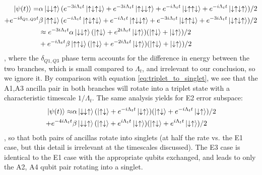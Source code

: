 \documentclass{report}
\begin{document}
\begin{align*}
    \ket{\psi(t)} = &\alpha\ket{\downarrow\downarrow\uparrow}(
        e^{-3 i \Lambda_t t }\ket{\uparrow\downarrow\uparrow\downarrow} 
    + e^{-3 i \Lambda_t t }\ket{\uparrow\downarrow\downarrow\uparrow}
    + e^{-i \Lambda_t t }\ket{\downarrow\uparrow\uparrow\downarrow}
    + e^{-i \Lambda_t t }\ket{\downarrow\uparrow\downarrow\uparrow})/2 \\
    + e^{-i\delta_{Q1,Q3} t} &\beta\ket{\uparrow\uparrow\downarrow}(
        e^{- i \Lambda_t t }\ket{\uparrow\downarrow\uparrow\downarrow} 
    + e^{- i \Lambda_t t }\ket{\uparrow\downarrow\downarrow\uparrow}
    + e^{-3i \Lambda_t t }\ket{\downarrow\uparrow\uparrow\downarrow}
    + e^{-3i \Lambda_t t }\ket{\downarrow\uparrow\downarrow\uparrow})/2 \\
    &\approx e^{-3 i \Lambda_t t}\alpha\ket{\downarrow\downarrow\uparrow}
    (\ket{\uparrow\downarrow} + e^{2 i \Lambda_t t }\ket{\downarrow\uparrow})
    (\ket{\uparrow\downarrow} + \ket{\downarrow\uparrow})/2 \\
    &+ e^{- i \Lambda_t t}\beta\ket{\uparrow\uparrow\downarrow}
    (\ket{\uparrow\downarrow} + e^{-2 i \Lambda_t t }\ket{\downarrow\uparrow})
    (\ket{\uparrow\downarrow} + \ket{\downarrow\uparrow})/2
\end{align*}, where the $\delta_{Q1, Q3}$ phase term accounts for the difference in energy between the two branches, which is small compared to $\Lambda_t$, and irrelevant to our conclusion, so we ignore it. By comparison with equation \ref{eq:triplet_to_singlet}, we see that the A1,A3 ancilla pair in both branches will rotate into a triplet state with a characteristic timescale $1/\Lambda_t$. The same analysis yields for E2 error subspace:
\begin{align*}
    \ket{\psi(t)} \approx &\alpha\ket{\downarrow\downarrow\uparrow}
    (\ket{\uparrow\downarrow} + e^{ -i \Lambda_t t }\ket{\downarrow\uparrow})
    (\ket{\uparrow\downarrow} + e^{ -i \Lambda_t t }\ket{\downarrow\uparrow})/2 \\
    + e^{-4 i \Lambda_t t} &\beta\ket{\downarrow\downarrow\uparrow}
    (\ket{\uparrow\downarrow} + e^{ i \Lambda_t t }\ket{\downarrow\uparrow})
    (\ket{\uparrow\downarrow} + e^{ i \Lambda_t t }\ket{\downarrow\uparrow})/2
\end{align*}, so that both pairs of ancillas rotate into singlets (at half the rate vs. the E1 case, but this detail is irrelevant at the timescales discussed). The E3 case is identical to the E1 case with the appropriate qubits exchanged, and leads to only the A2, A4 qubit pair rotating into a singlet.
\end{document}
